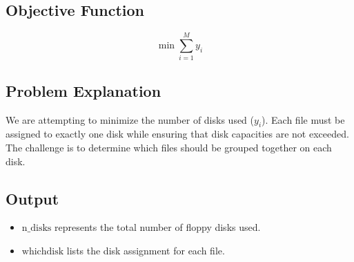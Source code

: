\documentclass{article}
\begin{document}
\subsection*{Objective Function}
\begin{equation}
    \min \sum_{i=1}^{M} y_i
\end{equation}

\subsection*{Problem Explanation}
We are attempting to minimize the number of disks used (\( y_i \)). Each file must be assigned to exactly one disk while ensuring that disk capacities are not exceeded. The challenge is to determine which files should be grouped together on each disk.

\subsection*{Output}
\begin{itemize}
    \item \(\text{n\_disks}\) represents the total number of floppy disks used.
    \item \(\text{whichdisk}\) lists the disk assignment for each file.
\end{itemize}
\end{document}
